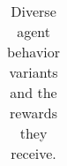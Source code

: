 {\begin{landscape}
\begin{table}[]
{\begin{tabular}{l|cccccccc|l}
            \end{tabular}%
        }
        \caption{Diverse agent behavior variants and the rewards they receive.}
        \label{appendix:baselines_rewards}
        \end{table}
        
        \end{landscape}
    

}



